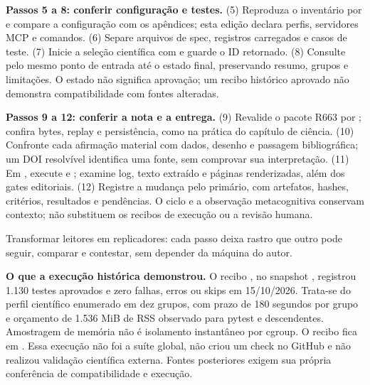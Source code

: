 \begin{descricao}
\textbf{Passos 5 a 8: conferir configuração e testes.} (5) Reproduza o
inventário por  e compare a configuração
com os apêndices; esta edição declara \CoreAgentCount{} perfis,
\CoreMCPCount{} servidores MCP e \CoreCommandCount{} comandos.
(6) Separe arquivos de spec, registros carregados e casos de teste.
(7) Inicie a seleção científica com
e guarde o ID retornado. (8) Consulte
 pelo mesmo ponto de entrada
até o estado final, preservando resumo, grupos e limitações. O estado
 não significa aprovação; um recibo histórico aprovado não
demonstra compatibilidade com fontes alteradas.
\end{descricao}

\begin{descricao}
\textbf{Passos 9 a 12: conferir a nota e a entrega.} (9) Revalide o pacote
R663 por ; confira bytes,
replay e persistência, como na prática do capítulo de ciência. (10) Confronte
cada afirmação material com dados, desenho e passagem bibliográfica; um DOI
resolvível identifica uma fonte, sem comprovar sua interpretação.
(11) Em , execute  e
; examine
log, texto extraído e páginas renderizadas, além dos gates editoriais.
(12) Registre a mudança pelo primário, com artefatos, hashes, critérios,
resultados e pendências. O ciclo e a observação metacognitiva conservam
contexto; não substituem os recibos de execução ou a revisão humana.
\end{descricao}

\begin{funcao}
Transformar leitores em replicadores: cada passo deixa rastro que outro pode seguir, comparar e contestar, sem depender da m\'aquina do autor.
\end{funcao}

\begin{resultado}
\textbf{O que a execução histórica demonstrou.} O recibo
, no snapshot
, registrou 1.130 testes aprovados e zero falhas, erros ou
skips em 15/10/2026. Trata-se do perfil científico enumerado em dez grupos,
com prazo de 180 segundos por grupo e orçamento de 1.536 MiB de RSS
observado para pytest e descendentes. Amostragem de memória não é isolamento
instantâneo por cgroup. O recibo fica em
.
Essa execução não foi a suíte global, não criou um check no GitHub e não
realizou validação científica externa. Fontes posteriores exigem sua própria
conferência de compatibilidade e execução.
\end{resultado}

